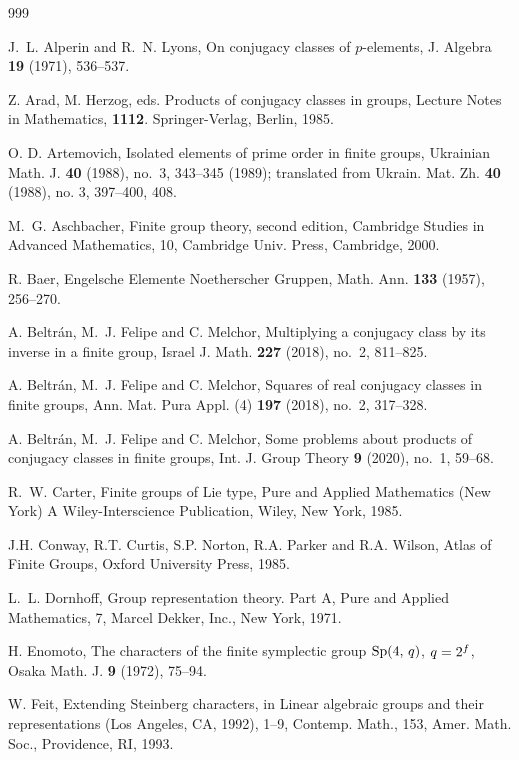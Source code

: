 \documentclass[twoside,a4paper,reqno,12pt]{amsart}
\newcommand{\<}{\langle}
\renewcommand{\>}{\rangle}
\renewcommand{\:}{\colon}
\theoremstyle{definition}
\begin{document}
\begin{thebibliography}{999}

 J.~L. Alperin and R.~N. Lyons, On conjugacy classes of $p$-elements, J. Algebra {\bf 19} (1971), 536--537.

 Z. Arad, M. Herzog, eds. Products of conjugacy classes in groups, Lecture Notes in Mathematics,  \textbf{1112}. Springer-Verlag,  Berlin, 1985.


 O. D. Artemovich, {Isolated elements of prime order in finite groups}, {Ukrainian Math. J.} {\bf 40} (1988), no.~3, 343--345 (1989); translated from Ukrain. Mat. Zh. \textbf{40} (1988), no. 3, 397--400, 408. 


 M.~G. Aschbacher, {Finite group theory}, second edition, 
Cambridge Studies in Advanced Mathematics, 10, Cambridge Univ. Press, Cambridge, 2000.

 R. Baer, Engelsche Elemente Noetherscher Gruppen, Math. Ann. {\bf 133} (1957), 256--270.

 A. Beltr\'an, M.~J. Felipe and C. Melchor, Multiplying a conjugacy class by its inverse in a finite group, {Israel J. Math.} {\bf 227} (2018), no.~2, 811--825.

 A. Beltr\'an, M.~J. Felipe and C. Melchor, Squares of real conjugacy classes in finite groups, {Ann. Mat. Pura Appl.} (4) {\bf 197} (2018), no.~2, 317--328.


 A. Beltr\'an, M.~J. Felipe and C. Melchor, Some problems about products of conjugacy classes in finite groups, Int. J. Group Theory {\bf 9} (2020), no.~1, 59--68.


 R.~W. Carter, { Finite groups of Lie type}, Pure and Applied Mathematics (New York) A Wiley-Interscience Publication,  Wiley, New York, 1985.

 J.H. Conway, R.T. Curtis, S.P. Norton, R.A. Parker and R.A. Wilson, {Atlas of  {F}inite {G}roups}, Oxford University Press, 1985.

 L.~L. Dornhoff, {Group representation theory. Part A}, Pure and Applied Mathematics, 7, Marcel Dekker, Inc., New York, 1971. 

H. Enomoto, The characters of the finite symplectic group ${\rm Sp}(4,\,q)$, $q=2\sp{f}$, Osaka Math. J. {\bf 9} (1972), 75--94.


 W. Feit, Extending Steinberg characters, in { Linear algebraic groups and their representations (Los Angeles, CA, 1992)}, 1--9, Contemp. Math., 153, Amer. Math. Soc., Providence, RI, 1993.


\end{thebibliography}
\end{document}
